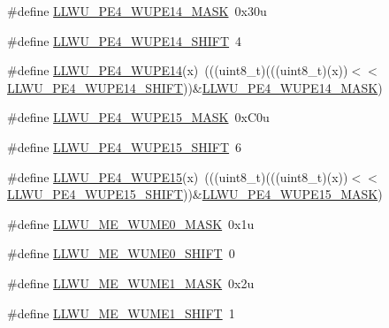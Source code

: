 \begin{DoxyCompactItemize}
\item 
\#define \hyperlink{group___l_l_w_u___register___masks_gae3a1e7b7497f719cfebd559f31dc4d07}{L\+L\+W\+U\+\_\+\+P\+E4\+\_\+\+W\+U\+P\+E14\+\_\+\+M\+A\+SK}~0x30u
\item 
\#define \hyperlink{group___l_l_w_u___register___masks_ga1942d07f99eb5afb836650dcfb2185af}{L\+L\+W\+U\+\_\+\+P\+E4\+\_\+\+W\+U\+P\+E14\+\_\+\+S\+H\+I\+FT}~4
\item 
\#define \hyperlink{group___l_l_w_u___register___masks_ga376a97009729f8dde435a783deb148d8}{L\+L\+W\+U\+\_\+\+P\+E4\+\_\+\+W\+U\+P\+E14}(x)~(((uint8\+\_\+t)(((uint8\+\_\+t)(x))$<$$<$\hyperlink{group___l_l_w_u___register___masks_ga1942d07f99eb5afb836650dcfb2185af}{L\+L\+W\+U\+\_\+\+P\+E4\+\_\+\+W\+U\+P\+E14\+\_\+\+S\+H\+I\+FT}))\&\hyperlink{group___l_l_w_u___register___masks_gae3a1e7b7497f719cfebd559f31dc4d07}{L\+L\+W\+U\+\_\+\+P\+E4\+\_\+\+W\+U\+P\+E14\+\_\+\+M\+A\+SK})
\item 
\#define \hyperlink{group___l_l_w_u___register___masks_ga53e48ffd153996ab89adb3c4df7511ee}{L\+L\+W\+U\+\_\+\+P\+E4\+\_\+\+W\+U\+P\+E15\+\_\+\+M\+A\+SK}~0x\+C0u
\item 
\#define \hyperlink{group___l_l_w_u___register___masks_gaeaf1e05b8de75133c46d6f11b3346732}{L\+L\+W\+U\+\_\+\+P\+E4\+\_\+\+W\+U\+P\+E15\+\_\+\+S\+H\+I\+FT}~6
\item 
\#define \hyperlink{group___l_l_w_u___register___masks_gadd015539f974ee2820707b9abf3787ba}{L\+L\+W\+U\+\_\+\+P\+E4\+\_\+\+W\+U\+P\+E15}(x)~(((uint8\+\_\+t)(((uint8\+\_\+t)(x))$<$$<$\hyperlink{group___l_l_w_u___register___masks_gaeaf1e05b8de75133c46d6f11b3346732}{L\+L\+W\+U\+\_\+\+P\+E4\+\_\+\+W\+U\+P\+E15\+\_\+\+S\+H\+I\+FT}))\&\hyperlink{group___l_l_w_u___register___masks_ga53e48ffd153996ab89adb3c4df7511ee}{L\+L\+W\+U\+\_\+\+P\+E4\+\_\+\+W\+U\+P\+E15\+\_\+\+M\+A\+SK})
\item 
\#define \hyperlink{group___l_l_w_u___register___masks_ga5f1588218d510ac13093055708ceae49}{L\+L\+W\+U\+\_\+\+M\+E\+\_\+\+W\+U\+M\+E0\+\_\+\+M\+A\+SK}~0x1u
\item 
\#define \hyperlink{group___l_l_w_u___register___masks_ga7f653f4ce89c4512437c0114f4659502}{L\+L\+W\+U\+\_\+\+M\+E\+\_\+\+W\+U\+M\+E0\+\_\+\+S\+H\+I\+FT}~0
\item 
\#define \hyperlink{group___l_l_w_u___register___masks_ga99b29643134140d21a3d4259b7f64c86}{L\+L\+W\+U\+\_\+\+M\+E\+\_\+\+W\+U\+M\+E1\+\_\+\+M\+A\+SK}~0x2u
\item 
\#define \hyperlink{group___l_l_w_u___register___masks_gac623d0db3076972370ee795830b555c1}{L\+L\+W\+U\+\_\+\+M\+E\+\_\+\+W\+U\+M\+E1\+\_\+\+S\+H\+I\+FT}~1

\end{DoxyCompactItemize}
